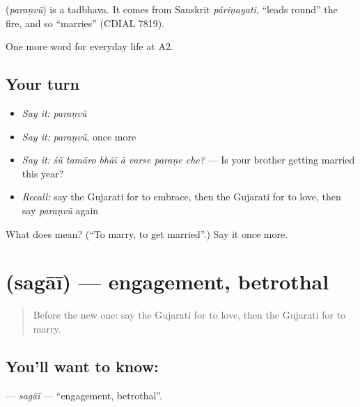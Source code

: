 \begin{cousinweb}
\textbf{} (\emph{paraṇvũ}) is a tadbhava. It comes from Sanskrit \emph{páriṇayati}, \textquotedblleft{}leads round\textquotedblright{} the fire, and so \textquotedblleft{}marries\textquotedblright{} (CDIAL 7819).
\end{cousinweb}

\begin{grammarlens}[title={What you've built}]
One more word for everyday life at A2.
\end{grammarlens}

\subsection*{Your turn}
\begin{itemize}
\raggedright
  \item \emph{Say it:} \emph{paraṇvũ}
  \item \emph{Say it:} \emph{paraṇvũ}, once more
  \item \emph{Say it:} \emph{śũ tamāro bhāī ā varse paraṇe che?} — Is your brother getting married this year?
  \item \emph{Recall:} say the Gujarati for to embrace, then the Gujarati for to love, then say \emph{paraṇvũ} again
\end{itemize}

\begin{tcolorbox}[breakable,colback=teal!4,colframe=teal!35!black,title={Before you move on}]
What does  mean? (\textquotedblleft{}To marry, to get married\textquotedblright{}.) Say it once more.
\end{tcolorbox}
\section[\texorpdfstring{\gu{સગાઈ} (sagāī)}{સગાઈ (sagāī)}]{ (sagāī) — engagement, betrothal}

\label{lesson:GU-C265-sagai}



\begin{quote}
Before the new one: say the Gujarati for to love, then the Gujarati for to marry.
\end{quote}

\subsection*{You'll want to know: }
\textbf{} — \emph{sagāī} — \textquotedblleft{}engagement, betrothal\textquotedblright{}.

